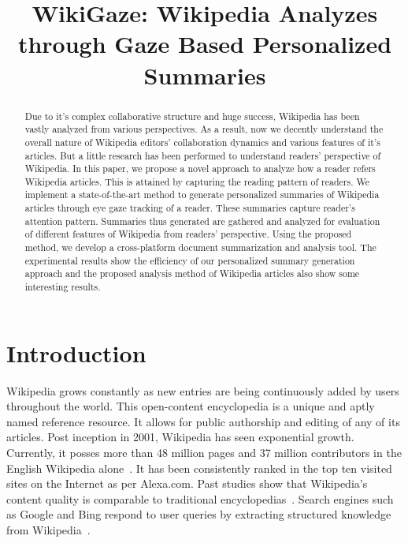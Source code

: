 \documentclass[12pt]{article}
\begin{document}
\title{WikiGaze: Wikipedia Analyzes through Gaze Based Personalized Summaries}
\maketitle

\begin{abstract}
  Due to it's complex collaborative structure and huge success, Wikipedia has been vastly analyzed from various perspectives. 
As a result, now we decently understand the overall nature of Wikipedia editors' collaboration dynamics and various features of it's articles. 
But a little research has been performed to understand readers' perspective of Wikipedia. 
In this paper, we propose a novel approach to analyze how a reader refers Wikipedia articles. 
This is attained by capturing the reading pattern of readers. 
We implement a state-of-the-art method to generate personalized summaries of Wikipedia articles through eye gaze tracking of a reader. 
These summaries capture reader's attention pattern. 
Summaries thus generated are gathered and analyzed for evaluation of different features of Wikipedia from readers' perspective. 
Using the proposed method, we develop a cross-platform document summarization and analysis tool. 
The experimental results show the efficiency of our personalized summary generation approach and the proposed analysis method of Wikipedia articles also show some interesting results.
\end{abstract}


\section{Introduction}
Wikipedia grows constantly as new entries are being continuously added by users throughout the world. This open-content encyclopedia is a unique and aptly named reference resource. It allows for public authorship and editing of any of its articles. Post inception in 2001, Wikipedia has seen exponential growth. Currently, it posses more than 48 million pages and 37 million contributors in the English Wikipedia alone~\cite{wiki:Wikipedia:Statistics}. It has been consistently ranked in the top ten visited sites on the Internet as per Alexa.com. Past studies show that Wikipedia's content quality is comparable to traditional encyclopedias~\cite{giles2005internet}. Search engines such as Google and Bing respond to user queries by extracting structured knowledge from Wikipedia~\cite{bergstrom2009conversation}.
\end{document}
